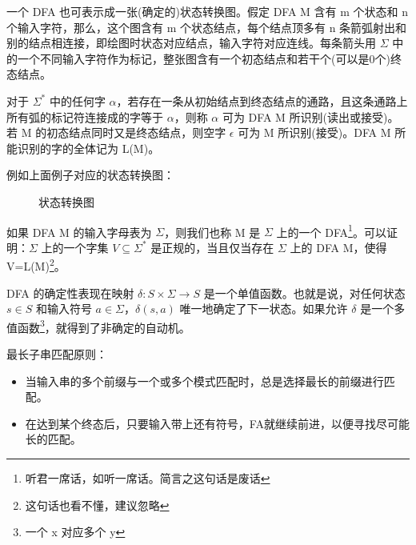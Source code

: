 一个 DFA 也可表示成一张(确定的)状态转换图。假定 DFA M 含有 m 个状态和 n 个输入字符，那么，这个图含有 m 个状态结点，每个结点顶多有 n 条箭弧射出和别的结点相连接，即\textcolor{tip}{绘图时状态对应结点，输入字符对应连线}。每条箭头用 $\Sigma$ 中的一个不同输入字符作为标记，整张图含有一个初态结点和若干个(可以是0个)终态结点。

对于 $\Sigma^*$ 中的任何字 $\alpha$，\textcolor{tip}{若存在一条从初始结点到终态结点的通路，且这条通路上所有弧的标记符连接成的字等于 $\alpha$，则称 $\alpha$ 可为 DFA M 所识别(读出或接受)。若 M 的初态结点同时又是终态结点，则空字 $\epsilon$ 可为 M 所识别(接受)。DFA M 所能识别的字的全体记为 L(M)。}

例如上面例子对应的状态转换图：

\begin{figure}[H]
    \centering
    \caption{状态转换图}
    \label{fig:状态转换图}
\end{figure}

如果 DFA M 的输入字母表为 $\Sigma$，则我们也称 M 是 $\Sigma$ 上的一个 DFA\footnote{听君一席话，如听一席话。简言之这句话是废话}。可以证明：$\Sigma$ 上的一个字集 $V \subseteq \Sigma^*$ 是正规的，当且仅当存在 $\Sigma$ 上的 DFA M，使得 V=L(M)\footnote{这句话也看不懂，建议忽略}。

DFA 的确定性表现在映射 $\delta:S\times \Sigma \rightarrow S$ 是一个单值函数。也就是说，对任何状态 $s\in S$ 和输入符号 $a\in \Sigma$，$\delta(s,a)$ 唯一地确定了下一状态。如果允许 $\delta$ 是一个多值函数\footnote{一个 x 对应多个 y}，就得到了非确定的自动机。

最长子串匹配原则：
\begin{itemize}
    \item 当输入串的多个前缀与一个或多个模式匹配时，总是选择最长的前缀进行匹配。
    \item 在达到某个终态后，只要输入带上还有符号，FA就继续前进，以便寻找尽可能长的匹配。
\end{itemize}

